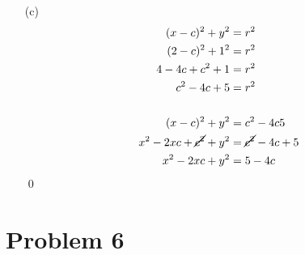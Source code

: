 \documentclass{article}
\begin{document}
\begin{itemize}
\item[(c)]
	\begin{align*}
		(x-c)^2+y^2&=r^2 \\
		(2-c)^2+1^2&=r^2 \\
		4-4c+c^2+1&=r^2 \\
		c^2-4c+5&=r^2 \\
		\\
		(x-c)^2+y^2&=c^2-4c5 \\
		x^2-2xc+\cancel{c^2}+y^2&=\cancel{c^2}-4c+5 \\
		x^2-2xc+y^2&=5-4c
	\end{align*}
	\qed

\end{itemize}

\section*{Problem 6}
\end{document}
